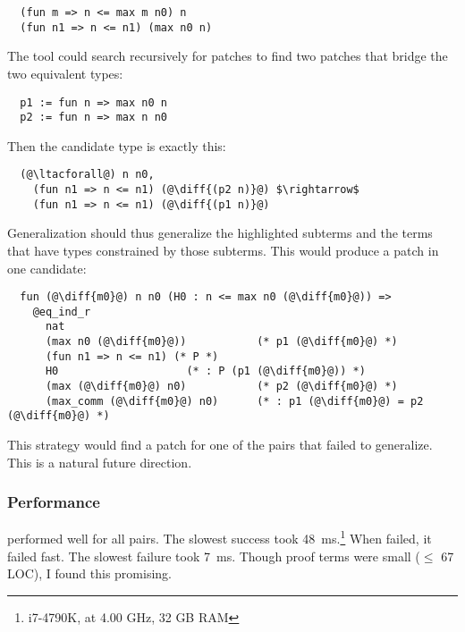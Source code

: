 \begin{lstlisting}
  (fun m => n <= max m n0) n
  (fun n1 => n <= n1) (max n0 n)
\end{lstlisting}
The tool could search recursively for patches to find two patches that bridge the two equivalent
types:

\begin{lstlisting}
  p1 := fun n => max n0 n
  p2 := fun n => max n n0
\end{lstlisting}
Then the candidate type is exactly this:

\begin{lstlisting}
  (@\ltacforall@) n n0,
    (fun n1 => n <= n1) (@\diff{(p2 n)}@) $\rightarrow$
    (fun n1 => n <= n1) (@\diff{(p1 n)}@)
\end{lstlisting}
Generalization should thus generalize the highlighted subterms and the
terms that have types constrained by those subterms.
This would produce a patch in one candidate:

\begin{lstlisting}
  fun (@\diff{m0}@) n n0 (H0 : n <= max n0 (@\diff{m0}@)) =>
    @eq_ind_r
      nat
      (max n0 (@\diff{m0}@))           (* p1 (@\diff{m0}@) *)
      (fun n1 => n <= n1) (* P *)
      H0                    (* : P (p1 (@\diff{m0}@)) *)
      (max (@\diff{m0}@) n0)           (* p2 (@\diff{m0}@) *)
      (max_comm (@\diff{m0}@) n0)      (* : p1 (@\diff{m0}@) = p2 (@\diff{m0}@) *)
\end{lstlisting}
This strategy would find a patch for one of the pairs that \sysname failed to generalize.
This is a natural future direction.

\subsubsection{Performance}
\label{sec:perf}

\sysname performed well for all pairs. The slowest success took \SI{48}{\ms}.\footnote{i7-4790K, at 4.00 GHz, 32 GB RAM}
When \sysname failed, it failed fast. The slowest failure took \SI{7}{\ms}.
Though proof terms were small ($\le$ 67 LOC), I found this promising.



